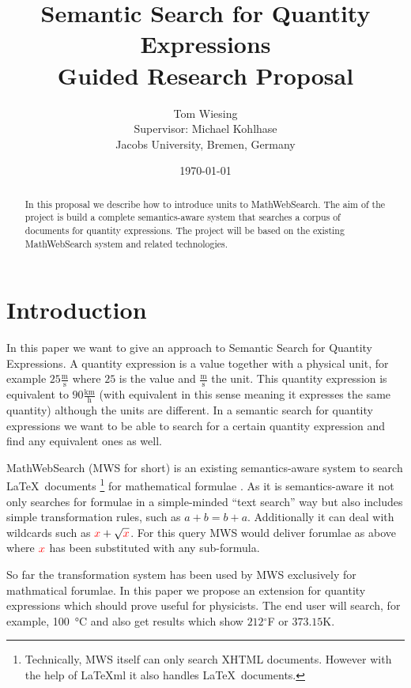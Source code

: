 \documentclass[11pt]{article}
\title{Semantic Search for Quantity Expressions\\ \vspace{2 mm} Guided Research Proposal}
\author{Tom Wiesing\\Supervisor: Michael Kohlhase\\Jacobs University, Bremen, Germany}
\date{\today}
\begin{document}
\maketitle

\begin{abstract}
  In this proposal we describe how to introduce units to MathWebSearch. The aim of the project is build a complete semantics-aware system that searches a corpus of documents for quantity expressions. The project will be based on the existing MathWebSearch system and related technologies.
\end{abstract}

\section{Introduction}

In this paper we want to give an approach to Semantic Search for Quantity Expressions. A quantity expression is a value together with a physical unit, for example $25 \frac{\text{m}}{\text{s}}$ where $25$ is the value and $\frac{\text{m}}{\text{s}}$ the unit. This quantity expression is equivalent to $90 \frac{\text{km}}{\text{h}}$ (with equivalent in this sense meaning it expresses the same quantity) although the units are different. In a semantic search for quantity expressions we want to be able to search for a certain quantity expression and find any equivalent ones as well.

MathWebSearch (MWS for short) is an existing semantics-aware system to search \LaTeX \  documents \footnote{Technically, MWS itself can only search XHTML documents. However with the help of \LaTeX{}ml \cite{Miller:latexml:base} it also handles \LaTeX \ documents. } for mathematical formulae \cite{HamKohPro:man14}. As it is semantics-aware it not only searches for formulae in a simple-minded ``text search'' way but also includes simple transformation rules, such as $a + b = b + a$. Additionally it can deal with wildcards such as $ { \color{red} x} + \sqrt{\color{red} x}$. For this query MWS would deliver forumlae as above where $ { \color{red} x} $ has been substituted with any sub-formula.

So far the transformation system has been used by MWS exclusively for mathmatical forumlae. In this paper we propose an extension for quantity expressions which should prove useful for physicists.
The end user will search, for example, \SI{100}{\degreeCelsius} and also get results which show $212$$^\circ$F or $373.15$K.
\end{document}

